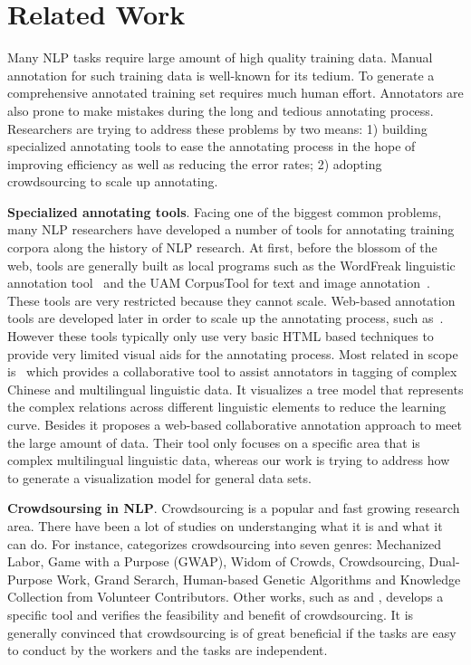 \section{Related Work}

Many NLP tasks require large amount of high quality training data.
Manual annotation for such training data is well-known for its tedium.
To generate a comprehensive annotated training set requires much human
effort. Annotators are also prone to make mistakes during the long and
tedious annotating process.  Researchers are trying to address these
problems by two means: 1) building specialized annotating tools to
ease the annotating process in the hope of improving efficiency as
well as reducing the error rates; 2) adopting crowdsourcing to scale
up annotating.

\textbf{Specialized annotating tools}. Facing one of the biggest common problems, many NLP researchers have developed a number of tools
for annotating training corpora along the history of NLP research. At
  first, before the blossom of the web, tools are generally built as
  local programs such as the WordFreak linguistic annotation
  tool~\cite{Morton2003WOT} and the  UAM CorpusTool for
  text and image annotation~\cite{ODonnell2008DUC}.
  These tools are very restricted because they cannot scale. Web-based
  annotation tools are developed later in order to scale up the
  annotating process, such as~\cite{Stuhrenberg2007WAA}.
  However these tools typically only use very basic HTML based
  techniques to provide very limited visual aids for the annotating
  process. Most related in scope is~\cite{yan2012collaborative} which
  provides a collaborative tool to assist annotators in tagging of
  complex Chinese and multilingual linguistic data. It visualizes a
  tree model that represents the complex relations across different
  linguistic elements to reduce the learning curve. Besides it
  proposes a web-based collaborative annotation approach to meet the
  large amount of data.  Their tool only focuses on a specific area
  that is complex multilingual linguistic data, whereas our work is
  trying to address how to generate a visualization model for general
  data sets.


\textbf{Crowdsoursing in NLP}. Crowdsourcing \cite{howe2006rise} is a
popular and fast growing research area. There have been a lot of
studies on understanging what it is and what it can do. For instance,
\cite{quinn2009taxonomy} categorizes crowdsourcing into seven genres:
Mechanized Labor, Game with a Purpose (GWAP), Widom of Crowds,
Crowdsourcing, Dual-Purpose Work, Grand Serarch, Human-based Genetic
Algorithms and Knowledge Collection from Volunteer Contributors. Other
works, such as \cite{abekawa2010community} and \cite{irvine2010using},
develops a specific tool and verifies the feasibility and benefit of
crowdsourcing. It is generally convinced that crowdsourcing is of
great beneficial if the tasks are easy to conduct by the workers and
the tasks are independent.

